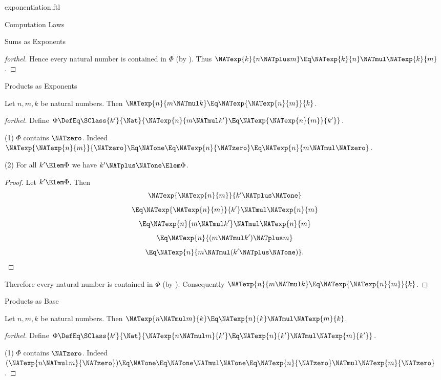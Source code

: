 \documentclass{stex}
\begin{document}
\begin{smodule}{exponentiation.ftl}
\begin{sfragment}{Computation Laws}
\begin{sfragment}{Sums as Exponents}
\begin{proof}[forthel]
      Hence every natural number is contained in $\Phi$ (by ).
      Thus $\NATexp{k}{n \NATplus m} \Eq \NATexp{k}{n} \NATmul \NATexp{k}{m}$.
    \end{proof}
  \end{sfragment}

  \begin{sfragment}{Products as Exponents}
    \begin{proposition}[forthel]
      Let $n, m, k$ be natural numbers.
      Then $\NATexp{n}{m \NATmul k} \Eq \NATexp{\NATexp{n}{m}}{k}$.
    \end{proposition}
    \begin{proof}[forthel]
      Define $\Phi \DefEq \SClass{k'}{\Nat}{\NATexp{n}{m \NATmul k'} \Eq \NATexp{\NATexp{n}{m}}{k'}}$.

      (1) $\Phi$ contains $\NATzero$.
      Indeed $\NATexp{\NATexp{n}{m}}{\NATzero}
        \Eq \NATone
        \Eq \NATexp{n}{\NATzero}
        \Eq \NATexp{n}{m \NATmul \NATzero}$.

      (2) For all $k' \Elem \Phi$ we have $k' \NATplus \NATone \Elem \Phi$.
      \begin{proof}
        Let $k' \Elem \Phi$.
        Then
        \[  \NATexp{\NATexp{n}{m}}{k' \NATplus \NATone}                \]
        \[    \Eq \NATexp{\NATexp{n}{m}}{k'} \NATmul \NATexp{n}{m}    \]
        \[    \Eq \NATexp{n}{m \NATmul k'} \NATmul \NATexp{n}{m}  \]
        \[    \Eq \NATexp{n}{(m \NATmul k') \NATplus m}        \]
        \[    \Eq \NATexp{n}{m \NATmul (k' \NATplus \NATone)}.       \]
      \end{proof}

      Therefore every natural number is contained in $\Phi$ (by ).
      Consequently $\NATexp{n}{m \NATmul k} \Eq \NATexp{\NATexp{n}{m}}{k}$.
    \end{proof}
  \end{sfragment}

  \begin{sfragment}{Products as Base}
    \begin{proposition}[forthel]
      Let $n, m, k$ be natural numbers.
      Then $\NATexp{n \NATmul m}{k} \Eq \NATexp{n}{k} \NATmul \NATexp{m}{k}$.
    \end{proposition}
    \begin{proof}[forthel]
      Define $\Phi \DefEq \SClass{k'}{\Nat}{\NATexp{n \NATmul m}{k'} \Eq \NATexp{n}{k'} \NATmul \NATexp{m}{k'}}$.

      (1) $\Phi$ contains $\NATzero$.
      Indeed $(\NATexp{n \NATmul m}{\NATzero})
        \Eq \NATone
        \Eq \NATone \NATmul \NATone
        \Eq \NATexp{n}{\NATzero} \NATmul \NATexp{m}{\NATzero}$. %


\end{proof}
\end{sfragment}
\end{sfragment}
\end{smodule}
\end{document}
